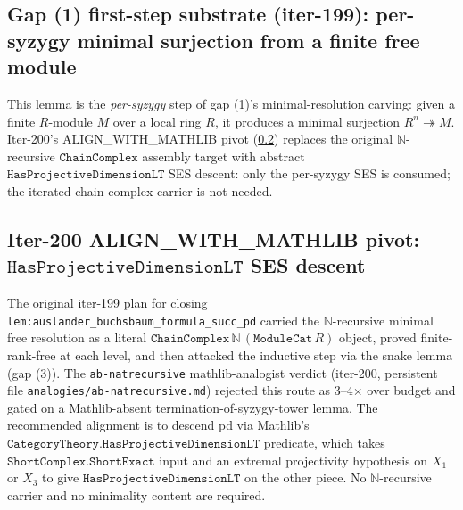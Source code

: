 \subsection{Gap (1) first-step substrate (iter-199): per-syzygy
  minimal surjection from a finite free module}
\label{subsec:ab_gap1_first_step}


This lemma is the \emph{per-syzygy} step of gap (1)'s
minimal-resolution carving: given a finite \(R\)-module \(M\)
over a local ring \(R\), it produces a minimal surjection
\(R^n \twoheadrightarrow M\). Iter-200's ALIGN\_WITH\_MATHLIB pivot
(\ref{subsec:ab_gap1_haspdlt_pivot}) replaces the original
\(\mathbb N\)-recursive \(\texttt{ChainComplex}\) assembly target
with abstract \(\texttt{HasProjectiveDimensionLT}\) SES descent: only
the per-syzygy SES is consumed; the iterated chain-complex carrier
is not needed.

\subsection{Iter-200 ALIGN\_WITH\_MATHLIB pivot: \(\texttt{HasProjectiveDimensionLT}\) SES descent}
\label{subsec:ab_gap1_haspdlt_pivot}

The original iter-199 plan for closing
\texttt{lem:auslander_buchsbaum_formula_succ_pd} carried the
\(\mathbb N\)-recursive minimal free resolution as a literal
\(\texttt{ChainComplex}\,\mathbb N\,(\texttt{ModuleCat}\,R)\) object,
proved finite-rank-free at each level, and then attacked the
inductive step via the snake lemma (gap (3)). The
\texttt{ab-natrecursive} mathlib-analogist verdict (iter-200,
persistent file \texttt{analogies/ab-natrecursive.md}) rejected this
route as 3--4\(\times\) over budget and gated on a Mathlib-absent
termination-of-syzygy-tower lemma. The recommended alignment is to
descend pd via Mathlib's
\(\texttt{CategoryTheory.HasProjectiveDimensionLT}\) predicate, which
takes \(\texttt{ShortComplex.ShortExact}\) input and an extremal
projectivity hypothesis on \(X_1\) or \(X_3\) to give
\(\texttt{HasProjectiveDimensionLT}\) on the other piece. No
\(\mathbb N\)-recursive carrier and no minimality content are
required.

